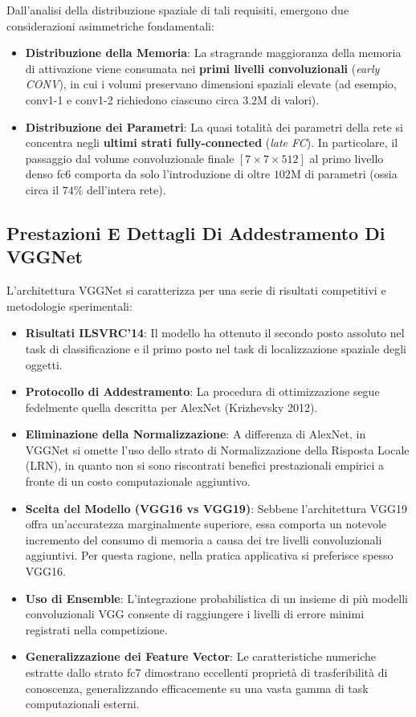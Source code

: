 ﻿\documentclass[11pt, a4paper]{article}
\begin{document}
Dall'analisi della distribuzione spaziale di tali requisiti, emergono due considerazioni asimmetriche fondamentali:
\begin{itemize}
    \item \textbf{Distribuzione della Memoria}: La stragrande maggioranza della memoria di attivazione viene consumata nei \textbf{primi livelli convoluzionali} (\emph{early CONV}), in cui i volumi preservano dimensioni spaziali elevate (ad esempio, conv1-1 e conv1-2 richiedono ciascuno circa $3.2\text{M}$ di valori).
    \item \textbf{Distribuzione dei Parametri}: La quasi totalità dei parametri della rete si concentra negli \textbf{ultimi strati fully-connected} (\emph{late FC}). In particolare, il passaggio dal volume convoluzionale finale $[7 \times 7 \times 512]$ al primo livello denso fc6 comporta da solo l'introduzione di oltre $102\text{M}$ di parametri (ossia circa il $74\%$ dell'intera rete).
\end{itemize}

\subsection{Prestazioni E Dettagli Di Addestramento Di VGGNet}

L'architettura VGGNet si caratterizza per una serie di risultati competitivi e metodologie sperimentali:
\begin{itemize}
    \item \textbf{Risultati ILSVRC'14}: Il modello ha ottenuto il secondo posto assoluto nel task di classificazione e il primo posto nel task di localizzazione spaziale degli oggetti.
    \item \textbf{Protocollo di Addestramento}: La procedura di ottimizzazione segue fedelmente quella descritta per AlexNet (Krizhevsky 2012).
    \item \textbf{Eliminazione della Normalizzazione}: A differenza di AlexNet, in VGGNet si omette l'uso dello strato di Normalizzazione della Risposta Locale (LRN), in quanto non si sono riscontrati benefici prestazionali empirici a fronte di un costo computazionale aggiuntivo.
    \item \textbf{Scelta del Modello (VGG16 vs VGG19)}: Sebbene l'architettura VGG19 offra un'accuratezza marginalmente superiore, essa comporta un notevole incremento del consumo di memoria a causa dei tre livelli convoluzionali aggiuntivi. Per questa ragione, nella pratica applicativa si preferisce spesso VGG16.
    \item \textbf{Uso di Ensemble}: L'integrazione probabilistica di un insieme di più modelli convoluzionali VGG consente di raggiungere i livelli di errore minimi registrati nella competizione.
    \item \textbf{Generalizzazione dei Feature Vector}: Le caratteristiche numeriche estratte dallo strato fc7 dimostrano eccellenti proprietà di trasferibilità di conoscenza, generalizzando efficacemente su una vasta gamma di task computazionali esterni.
\end{itemize}
\end{document}
